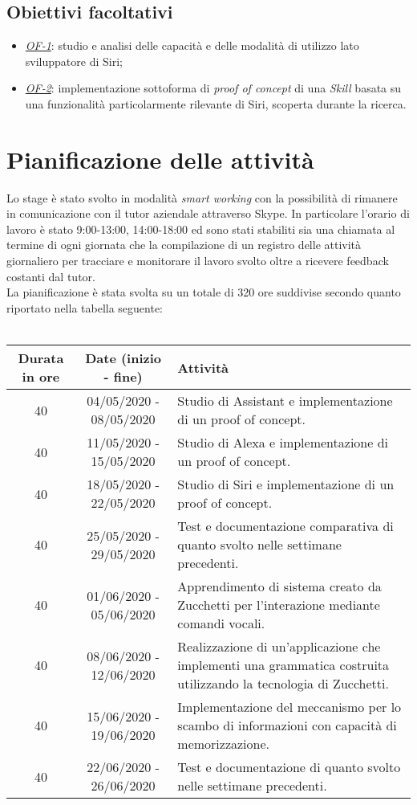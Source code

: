 	\subsection{Obiettivi facoltativi}
	\begin{itemize}
		\item \textit{\underline{OF-1}}: studio e analisi delle capacità e delle modalità di utilizzo lato sviluppatore di Siri;
		\item \textit{\underline{OF-2}}: implementazione sottoforma di \textit{proof of concept} di una \textit{Skill} basata su una funzionalità particolarmente rilevante di Siri, scoperta durante la ricerca.
	\end{itemize} 

\section{Pianificazione delle attività}
Lo stage è stato svolto in modalità \textit{smart working} con la possibilità di rimanere in comunicazione con il tutor aziendale attraverso Skype. In particolare l'orario di lavoro è stato 9:00-13:00, 14:00-18:00 ed sono stati stabiliti sia una chiamata al termine di ogni giornata che la compilazione di un registro delle attività giornaliero per tracciare e monitorare il lavoro svolto oltre a ricevere feedback costanti dal tutor. \\
La pianificazione è stata svolta su un totale di 320 ore suddivise secondo quanto riportato nella tabella seguente:
\\ \\
\begin{tabularx}{\textwidth}{|c|c|X|}
	\hline
	\textbf{Durata in ore} & \textbf{Date (inizio - fine)} & \textbf{Attività} \\\hline
	
	40 & 04/05/2020 - 08/05/2020 & Studio di Assistant e implementazione di un proof of concept. \\
	\hline
	40 & 11/05/2020 - 15/05/2020 & Studio di Alexa e implementazione di un proof of concept. \\
	\hline
	40 & 18/05/2020 - 22/05/2020 & Studio di Siri e implementazione di un proof of concept. \\
	\hline
	40 & 25/05/2020 - 29/05/2020 & Test e documentazione comparativa di quanto svolto nelle settimane precedenti. \\
	\hline
	40 & 01/06/2020 - 05/06/2020 & Apprendimento di sistema creato da Zucchetti per l'interazione mediante comandi vocali. \\
	\hline
	40 & 08/06/2020 - 12/06/2020 & Realizzazione di un'applicazione che implementi una grammatica costruita utilizzando la tecnologia di Zucchetti. \\
	\hline
	40 & 15/06/2020 - 19/06/2020 & Implementazione del meccanismo per lo scambo di informazioni con capacità di memorizzazione. \\
	\hline
	40 & 22/06/2020 - 26/06/2020 & Test e documentazione di quanto svolto nelle settimane precedenti. \\	
	\hline
\end{tabularx}
